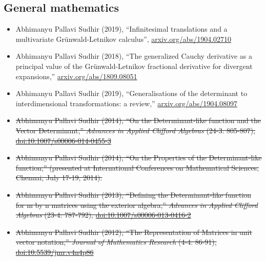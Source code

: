 \documentclass{article}
\newcommand{\disown}[1]{\sout{#1}}
\newcommand{\archive}{\color{lightgray}}
\begin{document}
{\archive

\subsection*{General mathematics}

\begin{itemize}

    \item
          Abhimanyu Pallavi Sudhir (2019),
          ``Infinitesimal translations and a multivariate Gr\"unwald-Letnikov calculus'', \href{https://arxiv.org/abs/1904.02710}{arxiv.org/abs/1904.02710}

    \item
          Abhimanyu Pallavi Sudhir (2018),
          ``The generalized Cauchy derivative as a principal value of the Gr\"unwald-Letnikov fractional derivative for divergent expansions,'' \href{https://arxiv.org/abs/1809.08051}{arxiv.org/abs/1809.08051}

    \item
          Abhimanyu Pallavi Sudhir (2019),
          ``Generalisations of the determinant to interdimensional transformations: a review,'' \href{https://arxiv.org/abs/1904.08097}{arxiv.org/abs/1904.08097}

    \item
          \disown{Abhimanyu Pallavi Sudhir (2014),
              ``On the Determinant-like function and the Vector Determinant,''
              \emph{Advances in Applied Clifford Algebras} (24-3: 805-807), \href{https://link.springer.com/article/10.1007/s00006-014-0455-3}{doi:10.1007/s00006-014-0455-3}}

    \item
          \disown{Abhimanyu Pallavi Sudhir (2014),
              ``On the Properties of the Determinant-like function,''
              (presented at International Conferences on Mathematical Sciences, Chennai, July 17-19, 2014).}

    \item
          \disown{Abhimanyu Pallavi Sudhir (2013),
              ``Defining the Determinant-like function for m by n matrices using the exterior algebra,''
              \emph{Advances in Applied Clifford Algebras} (23-4: 787-792),
              \href{https://link.springer.com/article/10.1007/s00006-013-0416-2}{doi:10.1007/s00006-013-0416-2}}

    \item
          \disown{Abhimanyu Pallavi Sudhir (2012),
              ``The Representation of Matrices in unit vector notation,''
              \emph{Journal of Mathematics Research} (4-4: 86-91),
              \href{https://dx.doi.org/10.5539/jmr.v4n4p86}{doi:10.5539/jmr.v4n4p86}}


\end{itemize}}
\end{document}
